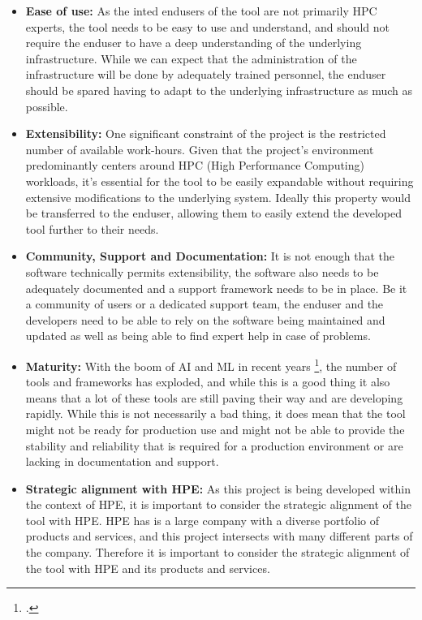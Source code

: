 \begin{itemize}
    \item \textbf{Ease of use:} 
        As the inted endusers of the tool are not primarily \ac{HPC} experts, the tool needs to be easy to use and understand,
        and should not require the enduser to have a deep understanding of the underlying infrastructure.
        While we can expect that the administration of the infrastructure will be done by adequately trained personnel, 
        the enduser should be spared having to adapt to the underlying infrastructure as much as possible.

    \item \textbf{Extensibility:}
        One significant constraint of the project is the restricted number of available work-hours.
        Given that the project's environment predominantly centers around HPC (High Performance Computing) workloads,
        it's essential for the tool to be easily expandable without requiring extensive modifications to the underlying system.
        Ideally this property would be transferred to the enduser, allowing them to easily extend the developed tool further to their needs.

    \item \textbf{Community, Support and  Documentation:}
        It is not enough that the software technically permits extensibility, the software also needs to be adequately documented and a support framework needs to be in place.
        Be it a community of users or a dedicated support team, the enduser and the developers need to be able to rely on the software being maintained and updated as well as being able to find expert help in case of problems.

    \item \textbf{Maturity:}
        With the boom of \ac{AI} and \ac{ML} in recent years \footcite{24TopAI}, the number of tools and frameworks has exploded, and while this is a good thing it also means that a lot of these tools are still paving their way and are developing rapidly.
        While this is not necessarily a bad thing, it does mean that the tool might not be ready for production use and might not be able to provide the stability and reliability that is required for a production environment or are lacking in documentation and support.      

    \item \textbf{Strategic alignment with \ac{HPE}:}
        As this project is being developed within the context of \ac{HPE}, it is important to consider the strategic alignment of the tool with \ac{HPE}.
        \ac{HPE} has is a large company with a diverse portfolio of products and services, and this project intersects with many different parts of the company.
        Therefore it is important to consider the strategic alignment of the tool with \ac{HPE} and its products and services.


\end{itemize}
